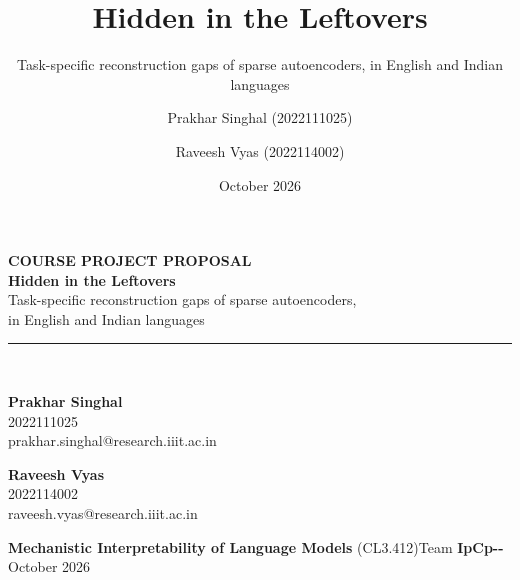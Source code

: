 \documentclass[aspectratio=169,10pt]{beamer}
\title{Hidden in the Leftovers}
\subtitle{Task-specific reconstruction gaps of sparse autoencoders, in English and Indian languages}
\author{Prakhar Singhal (2022111025) \and Raveesh Vyas (2022114002)}
\institute{Mechanistic Interpretability of Language Models (CL3.412)}
\date{October 2026}
\begin{document}
\begin{frame}[plain]
  \vspace*{0.35cm}
  {\color{accent}\footnotesize\bfseries COURSE PROJECT PROPOSAL}\\[8pt]
  {\fontsize{26}{30}\selectfont\bfseries Hidden in the Leftovers}\\[8pt]
  {\large\color{ink2}Task-specific reconstruction gaps of sparse autoencoders,\\in English and Indian languages}\\[10pt]
  {\color{accent}\rule{2.6cm}{1.6pt}}\\[14pt]
  \begin{minipage}[t]{0.42\textwidth}
    {\bfseries Prakhar Singhal}\\
    {\small\color{ink2}2022111025}\\
    {\footnotesize\ttfamily\color{ink2}prakhar.singhal@research.iiit.ac.in}
  \end{minipage}\hspace{0.04\textwidth}%
  \begin{minipage}[t]{0.42\textwidth}
    {\bfseries Raveesh Vyas}\\
    {\small\color{ink2}2022114002}\\
    {\footnotesize\ttfamily\color{ink2}raveesh.vyas@research.iiit.ac.in}
  \end{minipage}
  \vfill
  {\small\textbf{Mechanistic Interpretability of Language Models} (CL3.412)\hfill Team \textbf{IpCp-{}-}
    \;\textperiodcentered\; October 2026}
  \vspace*{0.05cm}
\end{frame}
\end{document}
